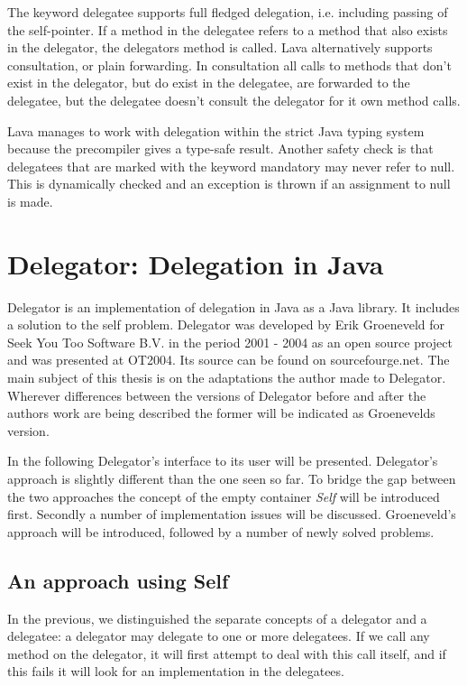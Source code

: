 \documentclass[a4paper,12pt]{book}
\begin{document}
The keyword delegatee supports full fledged delegation, i.e. including passing of the self-pointer. If a method in the delegatee refers to a method that also exists in the delegator, the delegators method is called. Lava alternatively supports consultation, or plain forwarding. In consultation all calls to methods that don't exist in the delegator, but do exist in the delegatee, are forwarded to the delegatee, but the delegatee doesn't consult the delegator for it own method calls. 

Lava manages to work with delegation within the strict Java typing system because the precompiler gives a type-safe result. Another safety check is that delegatees that are marked with the keyword mandatory may never refer to null.  This is dynamically checked and an exception is thrown if an assignment to null is made.

\chapter{Delegator: Delegation in Java}
Delegator is an implementation of delegation in Java as a Java library. It includes a solution to the self problem. Delegator was developed by Erik Groeneveld for Seek You Too Software B.V. in the period 2001 - 2004 as an open source project and was presented at OT2004. Its source can be found on sourcefourge.net. The main subject of this thesis is on the adaptations the author made to Delegator. Wherever differences between the versions of Delegator before and after the authors work are being described the former will be indicated as Groenevelds version.

In the following Delegator's interface to its user will be presented. Delegator's approach is slightly different than the one seen so far. To bridge the gap between the two approaches the concept of the empty container \emph{Self} will be introduced first. Secondly a number of implementation issues will be discussed. Groeneveld's approach will be introduced, followed by a number of newly solved problems.

\section*{An approach using Self}
In the previous, we distinguished the separate concepts of a delegator and a delegatee: a delegator may delegate to one or more delegatees. If we call any method on the delegator, it will first attempt to deal with this call itself, and if this fails it will look for an implementation in the delegatees. 
\end{document}
